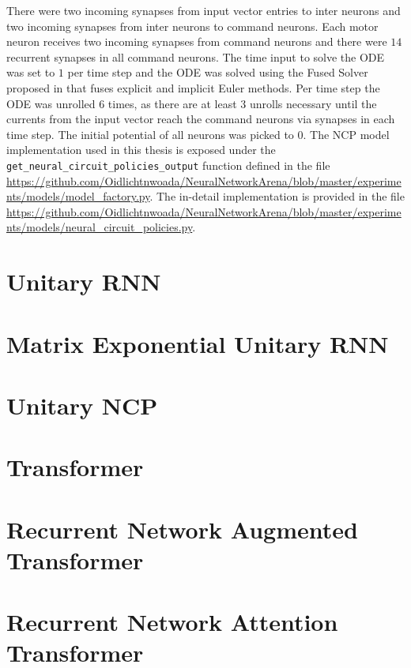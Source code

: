 \documentclass[draft,final]{vutinfth} %
\begin{document}
    There were two incoming synapses from input vector entries to inter neurons and two incoming synapses from inter neurons to command neurons.
    Each motor neuron receives two incoming synapses from command neurons and there were $14$ recurrent synapses in all command neurons.
    The time input to solve the ODE was set to $1$ per time step and the ODE was solved using the Fused Solver proposed in \cite{LTCNetworks} that fuses explicit and implicit Euler methods.
    Per time step the ODE was unrolled $6$ times, as there are at least $3$ unrolls necessary until the currents from the input vector reach the command neurons via synapses in each time step.
    The initial potential of all neurons was picked to $0$.
    The NCP model implementation used in this thesis is exposed under the \texttt{get\_neural\_circuit\_policies\_output} function defined in the file \url{https://github.com/Oidlichtnwoada/NeuralNetworkArena/blob/master/experiments/models/model_factory.py}.
    The in-detail implementation is provided in the file \url{https://github.com/Oidlichtnwoada/NeuralNetworkArena/blob/master/experiments/models/neural_circuit_policies.py}.

    \section{Unitary RNN} \label{urnn}

    \section{Matrix Exponential Unitary RNN} \label{meurnn}

    \section{Unitary NCP} \label{uncp}

    \section{Transformer} \label{transformer}

    \section{Recurrent Network Augmented Transformer} \label{rnaut}

    \section{Recurrent Network Attention Transformer} \label{rnatt}
\end{document}
